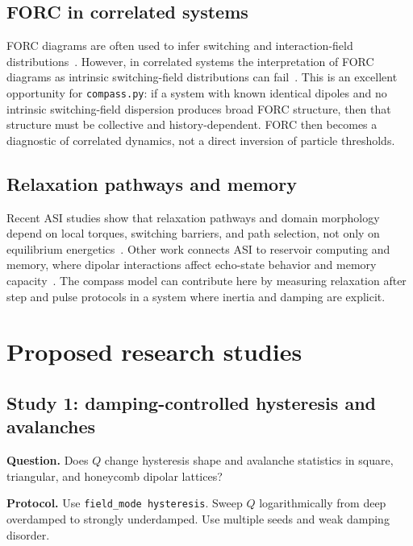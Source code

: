 \documentclass[11pt,a4paper]{article}
\newcommand{\code}[1]{\texttt{#1}}
\begin{document}
\subsection{FORC in correlated systems}

FORC diagrams are often used to infer switching and interaction-field distributions~\cite{pike1999,roberts2000}. However, in correlated systems the interpretation of FORC diagrams as intrinsic switching-field distributions can fail~\cite{ruta2017}. This is an excellent opportunity for \code{compass.py}: if a system with known identical dipoles and no intrinsic switching-field dispersion produces broad FORC structure, then that structure must be collective and history-dependent. FORC then becomes a diagnostic of correlated dynamics, not a direct inversion of particle thresholds.

\subsection{Relaxation pathways and memory}

Recent ASI studies show that relaxation pathways and domain morphology depend on local torques, switching barriers, and path selection, not only on equilibrium energetics~\cite{menniti2025}. Other work connects ASI to reservoir computing and memory, where dipolar interactions affect echo-state behavior and memory capacity~\cite{taniguchi2025}. The compass model can contribute here by measuring relaxation after step and pulse protocols in a system where inertia and damping are explicit.

\section{Proposed research studies}
\label{sec:studies}

\subsection{Study 1: damping-controlled hysteresis and avalanches}

\textbf{Question.} Does $Q$ change hysteresis shape and avalanche statistics in square, triangular, and honeycomb dipolar lattices?

\textbf{Protocol.} Use \code{field\_mode hysteresis}. Sweep $Q$ logarithmically from deep overdamped to strongly underdamped. Use multiple seeds and weak damping disorder.
\end{document}
